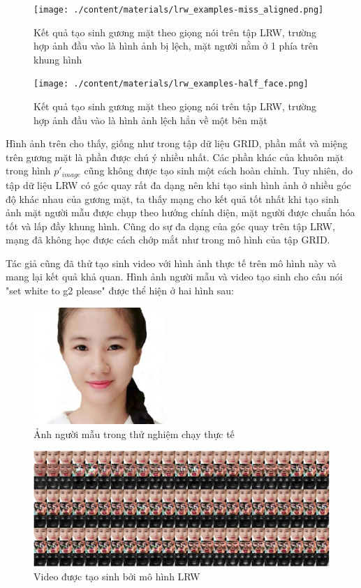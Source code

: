 \begin{figure}[H]
    \centering
    \texttt{[image: ./content/materials/lrw\_examples-miss\_aligned.png]}
    \caption{Kết quả tạo sinh gương mặt theo giọng nói trên tập LRW, trường hợp ảnh đầu vào là hình ảnh bị lệch, mặt người nằm ở 1 phía trên khung hình}
\end{figure}

\begin{figure}[H]
    \centering
    \texttt{[image: ./content/materials/lrw\_examples-half\_face.png]}
    \caption{Kết quả tạo sinh gương mặt theo giọng nói trên tập LRW, trường hợp ảnh đầu vào là hình ảnh lệch hẳn về một bên mặt}
\end{figure}

Hình ảnh trên cho thấy, giống như trong tập dữ liệu GRID, phần mắt và miệng trên gương mặt là phần được chú ý nhiều nhất. Các phần khác của khuôn mặt trong hình  $p'_{image}$ cũng không được tạo sinh một cách hoàn chỉnh. Tuy nhiên, do tập dữ liệu LRW có góc quay rất đa dạng nên khi tạo sinh hình ảnh ở nhiều góc độ khác nhau của gương mặt, ta thấy mạng cho kết quả tốt nhất khi tạo sinh ảnh mặt người mẫu được chụp theo hướng chính diện, mặt người được chuẩn hóa tốt và lấp đầy khung hình. Cũng do sự đa dạng của góc quay trên tập LRW, mạng đã không học được cách chớp mắt như trong mô hình của tập GRID.

Tác giả cũng đã thử tạo sinh video với hình ảnh thực tế trên mô hình này và mang lại kết quả khả quan. Hình ảnh người mẫu và video tạo sinh cho câu nói "set white to g2 please" được thể hiện ở hai hình sau:

\begin{figure}[H]
    \centering
    \includegraphics[width=5cm]{./content/materials/eny.png}
    \caption{Ảnh người mẫu trong thử nghiệm chạy thực tế}
\end{figure}

\begin{figure}[H]
    \centering
    \includegraphics[width=16cm]{./content/materials/eny_gen.png}
    \caption{Video được tạo sinh bởi mô hình LRW}
\end{figure}

